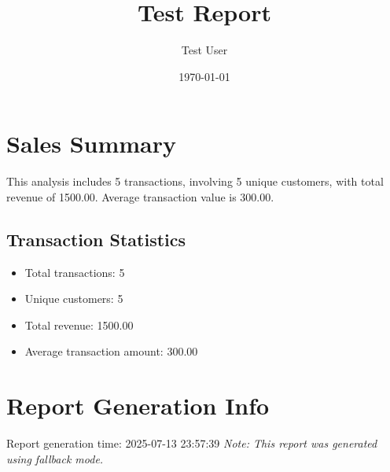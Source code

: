 \documentclass{article}
\title{Test Report}
\author{Test User}
\date{\today}
\begin{document}
\maketitle

\section{Sales Summary}
This analysis includes 5 transactions,
involving 5 unique customers,
with total revenue of 1500.00.
Average transaction value is 300.00.

\subsection{Transaction Statistics}
\begin{itemize}
\item Total transactions: 5
\item Unique customers: 5
\item Total revenue: 1500.00
\item Average transaction amount: 300.00
\end{itemize}

\section{Report Generation Info}
Report generation time: 2025-07-13 23:57:39
\textit{Note: This report was generated using fallback mode.}
\end{document}
